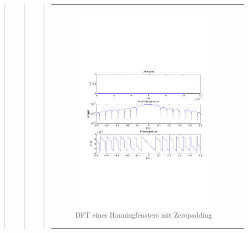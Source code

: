 \begin{quote}
\begin{quote}
\begin{quote}
\begin{center}
\begin{tabular}{ll}
\begin{minipage}{0.6\textwidth}
                    \end{minipage}
                    \begin{minipage}{0.6\textwidth}
    
                         \begin{figure}[H]
                            \label{fig:}
                            \includegraphics[scale=0.5, trim = 1.5cm 7cm 1.5cm 8cm, clip]{./Bilder/HanningDFTzeropadding} %
                            \caption{DFT eines Hanningfensters mit Zeropadding}
                        \end{figure}
                   \vspace{-1.5em}
    
                    \end{minipage}
    

\end{tabular}
\end{center}
\end{quote}
\end{quote}
\end{quote}
